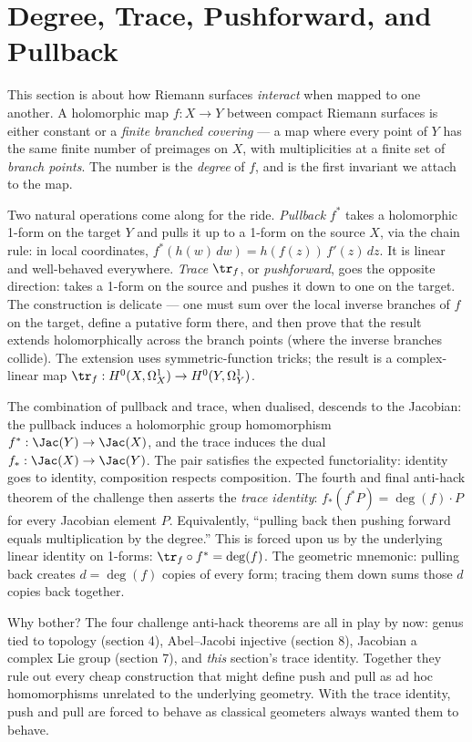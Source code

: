 \section{Degree, Trace, Pushforward, and Pullback}
\label{sec:degree-trace}

\begin{layman}
This section is about how Riemann surfaces \emph{interact} when
mapped to one another. A holomorphic map \(f : X \to Y\) between
compact Riemann surfaces is either constant or a \emph{finite
branched covering} --- a map where every point of \(Y\) has the same
finite number of preimages on \(X\), with multiplicities at a
finite set of \emph{branch points}. The number is the
\emph{degree} of \(f\), and is the first invariant we attach to
the map.

Two natural operations come along for the ride. \emph{Pullback}
\(f^*\) takes a holomorphic 1-form on the target \(Y\) and pulls
it up to a 1-form on the source \(X\), via the chain rule: in
local coordinates, \(f^*(h(w)\,dw) = h(f(z))\,f'(z)\,dz\). It is
linear and well-behaved everywhere. \emph{Trace} \(\tr_f\), or
\emph{pushforward}, goes the opposite direction: takes a 1-form
on the source and pushes it down to one on the target. The
construction is delicate --- one must sum over the local inverse
branches of \(f\) on the target, define a putative form there,
and then prove that the result extends holomorphically across
the branch points (where the inverse branches collide). The
extension uses symmetric-function tricks; the result is a
complex-linear map \(\tr_f : H^0(X, \Omega^1_X) \to
H^0(Y, \Omega^1_Y)\).

The combination of pullback and trace, when dualised, descends to
the Jacobian: the pullback induces a holomorphic group
homomorphism \(f^* : \Jac(Y) \to \Jac(X)\), and the trace induces
the dual \(f_* : \Jac(X) \to \Jac(Y)\). The pair satisfies the
expected functoriality: identity goes to identity, composition
respects composition. The fourth and final anti-hack theorem of
the challenge then asserts the \emph{trace identity}:
\(f_*(f^* P) = \deg(f) \cdot P\)
for every Jacobian element \(P\). Equivalently, ``pulling back
then pushing forward equals multiplication by the degree.'' This
is forced upon us by the underlying linear identity on 1-forms:
\(\tr_f \circ f^* = \deg(f)\).
The geometric mnemonic: pulling back creates \(d = \deg(f)\)
copies of every form; tracing them down sums those \(d\) copies
back together.

Why bother? The four challenge anti-hack theorems are all in
play by now: genus tied to topology (section 4), Abel--Jacobi
injective (section 8), Jacobian a complex Lie group (section 7),
and \emph{this} section's trace identity. Together they rule out
every cheap construction that might define push and pull as ad
hoc homomorphisms unrelated to the underlying geometry. With the
trace identity, push and pull are forced to behave as classical
geometers always wanted them to behave.
\end{layman}

